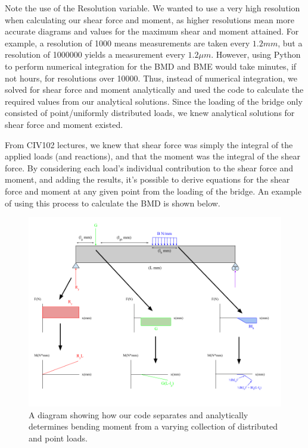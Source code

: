 \documentclass[11pt]{article}
\begin{document}
\par Note the use of the Resolution variable. We wanted to use a very high resolution when calculating our shear force and moment, as higher resolutions mean more accurate diagrams and values for the maximum shear and moment attained. For example, a resolution of 1000 means measurements are taken every $1.2 mm$, but a resolution of 1000000 yields a measurement every $1.2 \mu m$. However, using Python to perform numerical integration for the BMD and BME would take minutes, if not hours, for resolutions over 10000. Thus, instead of numerical integration, we solved for shear force and moment analytically and used the code to calculate the required values from our analytical solutions. Since the loading of the bridge only consisted of point/uniformly distributed loads, we knew analytical solutions for shear force and moment existed. 
\pagebreak
\par From CIV102 lectures, we knew that shear force was simply the integral of the applied loads (and reactions), and that the moment was the integral of the shear force. By considering each load's individual contribution to the shear force and moment, and adding the results, it's possible to derive equations for the shear force and moment at any given point from the loading of the bridge. An example of using this process to calculate the BMD is shown below. 
\begin{figure}[h]
\centering
\includegraphics[scale = 0.5]{images/BMD Code Explanation.png}
\caption{A diagram showing how our code separates and analytically determines bending moment from a varying collection of distributed and point loads.}
\end{figure}
\end{document}
